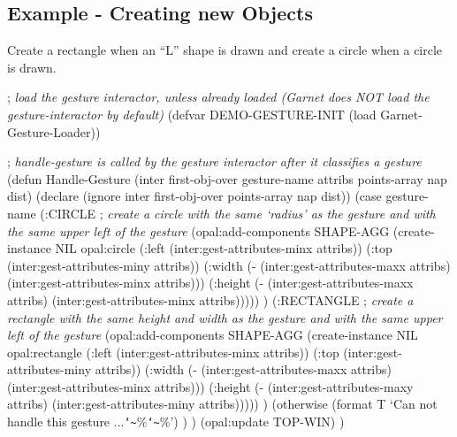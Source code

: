 \begin{group}
\subsection{Example - Creating new Objects}
Create a rectangle when an ``L'' shape is drawn and create a circle when
a circle is drawn.
\vspace{1 line}
\begin{programexample}
; {\it load the gesture interactor, unless already loaded (Garnet does NOT load the gesture-interactor by default)}
(defvar DEMO-GESTURE-INIT
    (load Garnet-Gesture-Loader))

; {\it handle-gesture is called by the gesture interactor after it classifies a gesture}
(defun Handle-Gesture (inter first-obj-over gesture-name attribs
                       points-array nap dist)
    (declare (ignore inter first-obj-over points-array nap dist))
    (case gesture-name
        (:CIRCLE
            ; {\it create a circle with the same `radius' as the gesture and with the same upper left of the gesture}
            (opal:add-components SHAPE-AGG
                (create-instance NIL opal:circle
                   (:left (inter:gest-attributes-minx attribs))
                   (:top (inter:gest-attributes-miny attribs))
                   (:width (- (inter:gest-attributes-maxx attribs)
                              (inter:gest-attributes-minx attribs)))
                   (:height (- (inter:gest-attributes-maxx attribs)
                               (inter:gest-attributes-minx attribs)))))
        )
        (:RECTANGLE
            ; {\it create a rectangle with the same height and width as the gesture and with the same upper left of the gesture}
            (opal:add-components SHAPE-AGG
                (create-instance NIL opal:rectangle
                   (:left (inter:gest-attributes-minx attribs))
                   (:top (inter:gest-attributes-miny attribs))
                   (:width (- (inter:gest-attributes-maxx attribs)
                              (inter:gest-attributes-minx attribs)))
                   (:height (- (inter:gest-attributes-maxy attribs)
                               (inter:gest-attributes-miny attribs)))))
        )
        (otherwise
            (format T `Can not handle this gesture ...{\tt\char`\~}\%{\tt\char`\~}\%')
        )
    )
    (opal:update TOP-WIN)
)


\end{programexample}
\end{group}
